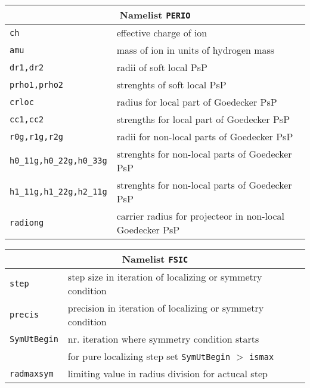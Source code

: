 \documentclass[12pt]{article}
\begin{document}
\begin{tabular}{ll}
\hline
\multicolumn{2}{c}{Namelist {\tt PERIO}} in {\tt for005.<name>} \\
\hline
{\tt ch}& effective charge of ion \\
{\tt amu}& mass of ion in units of hydrogen mass\\
{\tt dr1,dr2}& radii of soft local PsP\\
{\tt prho1,prho2}& strenghts of soft local PsP\\
{\tt crloc}& radius for local part of Goedecker PsP\\
{\tt cc1,cc2}& strengths for local part of  Goedecker PsP\\
{\tt r0g,r1g,r2g}& radii for non-local parts of  Goedecker PsP\\
{\tt h0\_11g,h0\_22g,h0\_33g}& 
  strenghts for non-local parts of  Goedecker PsP\\
{\tt h1\_11g,h1\_22g,h2\_11g}&
  strenghts for non-local parts of  Goedecker PsP\\
{\tt radiong}& carrier radius for projecteor in non-local Goedecker PsP\\
\hline
\end{tabular}


\begin{tabular}{ll}
\hline
\multicolumn{2}{c}{Namelist {\tt FSIC}} in {\tt for005.<name>} \\
\hline
{\tt step}& step size in iteration of localizing or symmetry condition \\
{\tt precis}& precision in iteration of localizing or symmetry condition \\
{\tt SymUtBegin}& nr. iteration where symmetry condition starts\\
 &               for pure localizing step set {\tt  SymUtBegin} $>$ {\tt ismax}\\
{\tt radmaxsym}& limiting value in radius division  for actucal step\\
\hline
\end{tabular}


\vspace*{2cm}
\end{document}
